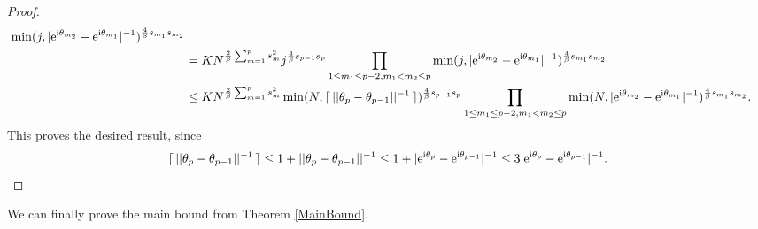 \documentclass[]{article}
\begin{document}
\begin{proof}
\begin{align*}
\min(j, |\mathrm{e}^{\textnormal{i} \theta_{m_2}} - \mathrm{e}^{\textnormal{i} \theta_{m_1}} |^{-1})^{\frac{4}{\beta} s_{m_1} s_{m_2}}
\\ & = K N^{\frac{2}{\beta} \sum_{m=1}^p s_m^2} 
j^{\frac{4}{\beta} s_{p-1} s_p}
\prod_{1 \leq m_1 \leq p-2, m_1 < m_2 \leq p} 
\min(j, |\mathrm{e}^{\textnormal{i} \theta_{m_2}} - \mathrm{e}^{\textnormal{i} \theta_{m_1}} |^{-1})^{\frac{4}{\beta} s_{m_1} s_{m_2}}
\\ & \leq K N^{\frac{2}{\beta} \sum_{m=1}^p s_m^2} 
\min(N,\lceil \, ||\theta_{p} - \theta_{p-1} ||^{-1} \, \rceil)^{\frac{4}{\beta} s_{p-1} s_p}
\prod_{1 \leq m_1 \leq p-2, m_1 < m_2 \leq p} 
\min(N, |\mathrm{e}^{\textnormal{i} \theta_{m_2}} - \mathrm{e}^{\textnormal{i} \theta_{m_1}} |^{-1})^{\frac{4}{\beta} s_{m_1} s_{m_2}}. 
\end{align*}
This proves the desired result, 
since 
$$\lceil \, ||\theta_{p} - \theta_{p-1} ||^{-1} \, \rceil \leq 1 + ||\theta_{p} - \theta_{p-1} ||^{-1} 
\leq 1 + |\mathrm{e}^{\textnormal{i} \theta_{p}}
- \mathrm{e}^{\textnormal{i} \theta_{p-1}}|^{-1} \leq 
3 |\mathrm{e}^{\textnormal{i} \theta_{p}}
- \mathrm{e}^{\textnormal{i} \theta_{p-1}}|^{-1}.
$$
\end{proof}


We can finally prove the main bound from Theorem \ref{MainBound}.
\end{document}
